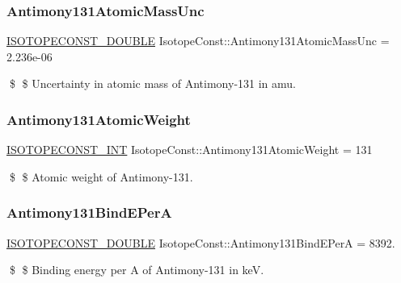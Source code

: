 \subsubsection{\texorpdfstring{Antimony131\+Atomic\+Mass\+Unc}{Antimony131AtomicMassUnc}}
{\footnotesize\ttfamily \mbox{\hyperlink{group___isotope_const-_macros_ga8f45a7272ce02c0b4c65c44636ed719a}{I\+S\+O\+T\+O\+P\+E\+C\+O\+N\+S\+T\+\_\+\+D\+O\+U\+B\+LE}} Isotope\+Const\+::\+Antimony131\+Atomic\+Mass\+Unc = 2.\+236e-\/06}

\$ \$ Uncertainty in atomic mass of Antimony-\/131 in amu. \mbox{\label{group___isotope_const-_antimony-_sb131_gaf3752e8749d63c7c74a8d305f692adbe}} 
\subsubsection{\texorpdfstring{Antimony131\+Atomic\+Weight}{Antimony131AtomicWeight}}
{\footnotesize\ttfamily \mbox{\hyperlink{group___isotope_const-_macros_ga5f18360b3e99483a35c32d789e62621c}{I\+S\+O\+T\+O\+P\+E\+C\+O\+N\+S\+T\+\_\+\+I\+NT}} Isotope\+Const\+::\+Antimony131\+Atomic\+Weight = 131}

\$ \$ Atomic weight of Antimony-\/131. \mbox{\label{group___isotope_const-_antimony-_sb131_gad18c2ad7785e099964a699017ea5c375}} 
\subsubsection{\texorpdfstring{Antimony131\+Bind\+E\+PerA}{Antimony131BindEPerA}}
{\footnotesize\ttfamily \mbox{\hyperlink{group___isotope_const-_macros_ga8f45a7272ce02c0b4c65c44636ed719a}{I\+S\+O\+T\+O\+P\+E\+C\+O\+N\+S\+T\+\_\+\+D\+O\+U\+B\+LE}} Isotope\+Const\+::\+Antimony131\+Bind\+E\+PerA = 8392.}

\$ \$ Binding energy per A of Antimony-\/131 in keV. \mbox{\label{group___isotope_const-_antimony-_sb131_ga25c8487bedc66d9fea1106de04e292b6}} 
